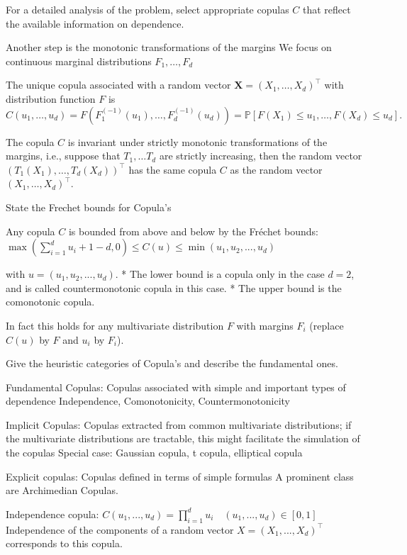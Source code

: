 For a detailed analysis of the problem, select appropriate copulas \(C\) that reflect the available information on dependence.

Another step is the monotonic transformations of the margins
We focus on continuous marginal distributions \(F_1, \ldots, F_d\)

The unique copula associated with a random vector \(\mathbf{X} = (X_1, \ldots, X_d)^\top\) with distribution function \(F\) is 
\(C(u_1, \ldots, u_d) = F(F_1^{(-1)}(u_1), \ldots, F_d^{(-1)}(u_d)) = \mathbb{P}[F(X_1) \leq u_1, \ldots, F(X_d) \leq u_d].\)

The copula \( C \) is invariant under strictly monotonic transformations of the margins, i.e., 
suppose that \(T_1, \ldots T_d\) are strictly increasing, then the random vector \( (T_1(X_1), \ldots, T_d(X_d))^\top \) 
has the same copula \( C \) as the random vector \( (X_1, \ldots, X_d)^\top \).


State the Frechet bounds for Copula's

Any copula \(C\) is bounded from above and below by the Fréchet bounds:
\(\max \left( \sum_{i = 1}^d u_i + 1 - d, 0 \right) \le C(u) \le \min(u_1, u_2, ..., u_d)\)

with \(u = (u_1, u_2, ..., u_d)\).
* The lower bound is a copula only in the case \(d = 2\), and is called countermonotonic copula in this case.
* The upper bound is the comonotonic copula.

In fact this holds for any multivariate distribution \( F \) with margins \( F_i \) (replace \( C(u) \) by \( F \) and \( u_i \) by \( F_i \)).


Give the heuristic categories of Copula's and describe the fundamental ones.

Fundamental Copulas:
Copulas associated with simple and important types of dependence
Independence, Comonotonicity, Countermonotonicity

Implicit Copulas:
Copulas extracted from common multivariate distributions; if the multivariate distributions are tractable, 
this might facilitate the simulation of the copulas
Special case: Gaussian copula, t copula, elliptical copula

Explicit copulas:
Copulas defined in terms of simple formulas
A prominent class are Archimedian Copulas.


Independence copula:
\(C(u_1, ..., u_d) = \prod_{i = 1}^d u_i \quad (u_1, ..., u_d) \in [0, 1]\)
Independence of the components of a random vector \(X = (X_1, ..., X_d)^\top\) corresponds to this copula.

